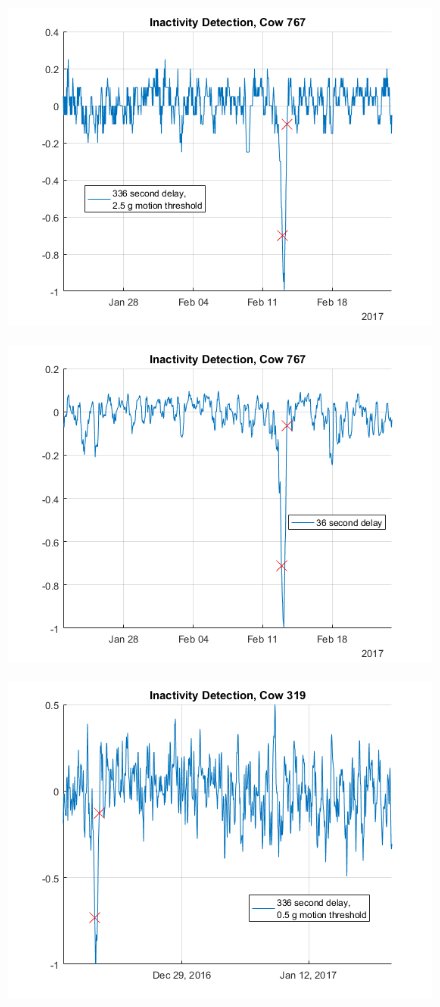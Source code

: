 \begin{figure}[htb]
\centering
\includegraphics[width = 0.75 \textwidth]{figures/InactivityDetectionCow767_336period2_5threshold.png}
\caption{}
\label{InactivityDetectionCow767_336period2_5threshold}
\end{figure}

\begin{figure}[htb]
\centering
\includegraphics[width = 0.75 \textwidth]{figures/InactivityDetectionCow767_36period.png}
\caption{}
\label{InactivityDetectionCow767_36period}
\end{figure}

\begin{figure}[htb]
\centering
\includegraphics[width = 0.75 \textwidth]{figures/InactivityDetectionCow319_336period05threshold.png}
\caption{}
\label{InactivityDetectionCow319_336period05threshold}
\end{figure}

